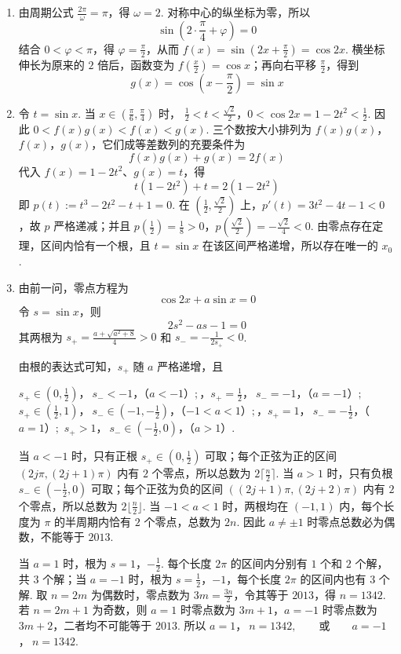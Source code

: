 \begin{solution}
\begin{enumerate}
\item 由周期公式 \(\frac{2\pi}{\omega}=\pi\)，得 \(\omega=2\). 对称中心的纵坐标为零，所以
\[
\sin\left(2\cdot\frac\pi4+\varphi\right)=0
\]
结合 \(0<\varphi<\pi\)，得 \(\varphi=\frac\pi2\)，从而 \(f(x)=\sin(2x+\frac\pi2)=\cos2x\). 横坐标伸长为原来的 \(2\) 倍后，函数变为 \(f(\frac x2)=\cos x\)；再向右平移 \(\frac\pi2\)，得到
\[
g(x)=\cos\left(x-\frac\pi2\right)=\sin x
\]
\item 令 \(t=\sin x\). 当 \(x\in(\frac\pi6,\frac\pi4)\) 时，
\(\frac12<t<\frac{\sqrt2}{2}\)，\(0<\cos2x=1-2t^2<\frac12\).
因此 \(0<f(x)g(x)<f(x)<g(x)\). 三个数按大小排列为 \(f(x)g(x)\)，\(f(x)\)，\(g(x)\)，它们成等差数列的充要条件为
\[
f(x)g(x)+g(x)=2f(x)
\]
代入 \(f(x)=1-2t^2\)、\(g(x)=t\)，得
\[
t(1-2t^2)+t=2(1-2t^2)
\]
即 \(p(t):=t^3-2t^2-t+1=0\). 在 \((\frac12,\frac{\sqrt2}{2})\) 上，\(p'(t)=3t^2-4t-1<0\)，故 \(p\) 严格递减；并且
\(p\left(\frac12\right)=\frac18>0\)，\(p\left(\frac{\sqrt2}{2}\right)=-\frac{\sqrt2}{4}<0\).
由零点存在定理，区间内恰有一个根，且 \(t=\sin x\) 在该区间严格递增，所以存在唯一的 \(x_0\).
\item 由前一问，零点方程为
\[
\cos2x+a\sin x=0
\]
令 \(s=\sin x\)，则
\[
2s^2-as-1=0
\]
其两根为 \(s_+=\frac{a+\sqrt{a^2+8}}4>0\) 和 \(s_-=-\frac1{2s_+}<0\).

由根的表达式可知，\(s_+\) 随 \(a\) 严格递增，且

\(s_+\in(0,\tfrac12)\)，\(\ s_-<-1\)，（\(a<-1\)）\(;\)，\(s_+=\tfrac12\)，\(\ s_-=-1\)，（\(a=-1\)）\(;\)
\(s_+\in(\tfrac12,1)\)，\(\ s_-\in(-1,-\tfrac12)\)，（\(-1<a<1\)）\(;\)，\(s_+=1\)，\(\ s_-=-\tfrac12\)，（\(a=1\)）\(;\)
\(s_+>1\)，\(\ s_-\in(-\tfrac12,0)\)，（\(a>1\)）.

当 \(a<-1\) 时，只有正根 \(s_+\in(0,\frac12)\) 可取；每个正弦为正的区间 \((2j\pi,(2j+1)\pi)\) 内有 \(2\) 个零点，所以总数为 \(2\lceil \frac{n}{2}\rceil\). 当 \(a>1\) 时，只有负根 \(s_-\in(-\frac12,0)\) 可取；每个正弦为负的区间 \(((2j+1)\pi,(2j+2)\pi)\) 内有 \(2\) 个零点，所以总数为 \(2\lfloor \frac{n}{2}\rfloor\). 当 \(-1<a<1\) 时，两根均在 \((-1,1)\) 内，每个长度为 \(\pi\) 的半周期内恰有 \(2\) 个零点，总数为 \(2n\). 因此 \(a\ne\pm1\) 时零点总数必为偶数，不能等于 \(2013\).

当 \(a=1\) 时，根为 \(s=1\)，\(-\frac12\). 每个长度 \(2\pi\) 的区间内分别有 \(1\) 个和 \(2\) 个解，共 \(3\) 个解；当 \(a=-1\) 时，根为 \(s=\frac12\)，\(-1\)，每个长度 \(2\pi\) 的区间内也有 \(3\) 个解. 取 \(n=2m\) 为偶数时，零点数为 \(3m=\frac{3n}{2}\)，令其等于 \(2013\)，得 \(n=1342\). 若 \(n=2m+1\) 为奇数，则 \(a=1\) 时零点数为 \(3m+1\)，\(a=-1\) 时零点数为 \(3m+2\)，二者均不可能等于 \(2013\). 所以
\(a=1\)，\(\ n=1342,\qquad\text{或}\qquad a=-1\)，\(\ n=1342\).
\end{enumerate}
\end{solution}

